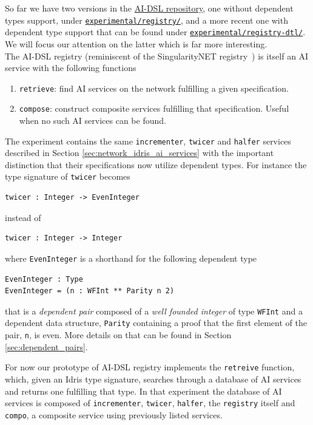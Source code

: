 \documentclass[]{report}
\begin{document}
So far we have two versions in the
\href{https://github.com/singnet/ai-dsl/}{AI-DSL repository}, one
without dependent types support, under
\href{https://github.com/singnet/ai-dsl/blob/master/experimental/registry/}{\texttt{experimental/registry/}},
and a more recent one with dependent type support that can be found
under
\href{https://github.com/singnet/ai-dsl/blob/master/experimental/registry-dtl/}{\texttt{experimental/registry-dtl/}}.
We will focus our attention on the latter which is far more
interesting.\\

The AI-DSL registry (reminiscent of the SingularityNET
registry~\cite{SNETRegistry}) is itself an AI service with the following functions
\begin{enumerate}
\item \texttt{retrieve}: find AI services on the network fulfilling a
  given specification.
\item \texttt{compose}: construct composite services fulfilling that
  specification.  Useful when no such AI services can be found.
\end{enumerate}

The experiment contains the same \texttt{incrementer}, \texttt{twicer}
and \texttt{halfer} services described in Section
\ref{sec:network_idris_ai_services} with the important distinction that
their specifications now utilize dependent types.  For instance the
type signature of \texttt{twicer} becomes
\begin{verbatim}
twicer : Integer -> EvenInteger
\end{verbatim}
instead of
\begin{verbatim}
twicer : Integer -> Integer
\end{verbatim}
where \texttt{EvenInteger} is a shorthand for the following
dependent type
\begin{verbatim}
EvenInteger : Type
EvenInteger = (n : WFInt ** Parity n 2)
\end{verbatim}
that is a \emph{dependent pair} composed of a \emph{well founded
integer} of type \texttt{WFInt} and a dependent data structure,
\texttt{Parity} containing a proof that the first element of the pair,
\texttt{n}, is even.  More details on that can be found in
Section \ref{sec:dependent_pairs}.

For now our prototype of AI-DSL registry implements the
\texttt{retreive} function, which, given an Idris type signature,
searches through a database of AI services and returns one fulfilling
that type.  In that experiment the database of AI services is composed
of \texttt{incrementer}, \texttt{twicer}, \texttt{halfer}, the
\texttt{registry} itself and \texttt{compo}, a composite service using
previously listed services.
\end{document}
